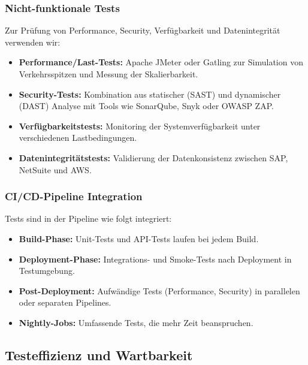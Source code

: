 \subsubsection{Nicht-funktionale Tests}
Zur Prüfung von Performance, Security, Verfügbarkeit und Datenintegrität verwenden wir:

\begin{itemize}
    \item \textbf{Performance/Last-Tests:} Apache JMeter oder Gatling zur Simulation von
    Verkehrsspitzen und Messung der Skalierbarkeit.
    \item \textbf{Security-Tests:} Kombination aus statischer (SAST) und dynamischer (DAST)
    Analyse mit Tools wie SonarQube, Snyk oder OWASP ZAP.
    \item \textbf{Verfügbarkeitstests:} Monitoring der Systemverfügbarkeit unter verschiedenen
    Lastbedingungen.
    \item \textbf{Datenintegritätstests:} Validierung der Datenkonsistenz zwischen SAP,
    NetSuite und AWS.
\end{itemize}

\subsubsection{CI/CD-Pipeline Integration}
Tests sind in der Pipeline wie folgt integriert:

\begin{itemize}
    \item \textbf{Build-Phase:} Unit-Tests und API-Tests laufen bei jedem Build.
    \item \textbf{Deployment-Phase:} Integrations- und Smoke-Tests nach Deployment in Testumgebung.
    \item \textbf{Post-Deployment:} Aufwändige Tests (Performance, Security) in parallelen oder
    separaten Pipelines.
    \item \textbf{Nightly-Jobs:} Umfassende Tests, die mehr Zeit beanspruchen.
\end{itemize}

\subsection{Testeffizienz und Wartbarkeit}
